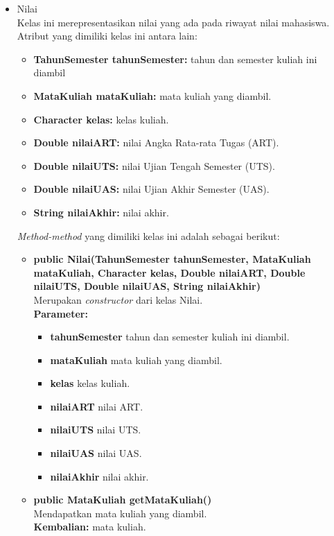 \begin{enumerate}
\begin{itemize}
				\item Nilai\\
				Kelas ini merepresentasikan nilai yang ada pada riwayat nilai mahasiswa. Atribut yang dimiliki kelas ini antara lain:
				\begin{itemize}
					\item \textbf{TahunSemester tahunSemester:} tahun dan semester kuliah ini diambil
					\item \textbf{MataKuliah mataKuliah:} mata kuliah yang diambil.
					\item \textbf{Character kelas:} kelas kuliah.
					\item \textbf{Double nilaiART:} nilai Angka Rata-rata Tugas (ART).
					\item \textbf{Double nilaiUTS:} nilai Ujian Tengah Semester (UTS).
					\item \textbf{Double nilaiUAS:} nilai Ujian Akhir Semester (UAS).
					\item \textbf{String nilaiAkhir:} nilai akhir.
				\end{itemize}
			\textit{Method-method} yang dimiliki kelas ini adalah sebagai berikut:
				\begin{itemize}
					\item \textbf{public Nilai(TahunSemester tahunSemester, MataKuliah mataKuliah, Character kelas, Double nilaiART, Double nilaiUTS, Double nilaiUAS, String nilaiAkhir)}\\
						Merupakan \textit{constructor} dari kelas Nilai.\\
						\textbf{Parameter:}
						\begin{itemize}
							\item \textbf{tahunSemester} tahun dan semester kuliah ini diambil.
							\item \textbf{mataKuliah} mata kuliah yang diambil.
							\item \textbf{kelas} kelas kuliah.
							\item \textbf{nilaiART} nilai ART.
							\item \textbf{nilaiUTS} nilai UTS.
							\item \textbf{nilaiUAS} nilai UAS.
							\item \textbf{nilaiAkhir} nilai akhir.
						\end{itemize}
						
					\item \textbf{public MataKuliah getMataKuliah()}\\
						Mendapatkan mata kuliah yang diambil.\\
						\textbf{Kembalian:} mata kuliah.
						

\end{itemize}
\end{itemize}
\end{enumerate}
